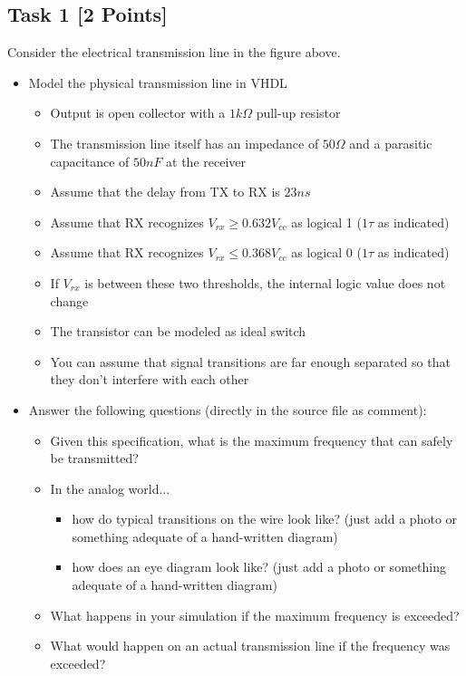 \documentclass[12pt,epsf,makeidx,oneside]{book}
\begin{document}
\subsection{Task 1 [2 Points]}
Consider the electrical transmission line in the figure above.
\begin{itemize}[noitemsep]
  \item Model the physical transmission line in VHDL
  \begin{itemize}[noitemsep]
    \item Output is open collector with a $1k\Omega $ pull-up resistor
    \item The transmission line itself has an impedance of $50\Omega$ and a parasitic capacitance of $50nF$ at the receiver
    \item Assume that the delay from TX to RX is $23ns$
    \item Assume that RX recognizes $V_{rx}\ge0.632V_{cc}$ as logical 1 ($1\tau$ as indicated)
    \item Assume that RX recognizes $V_{rx}\le0.368V_{cc}$ as logical 0 ($1\tau$ as indicated)
    \item If $V_{rx}$ is between these two thresholds, the internal logic value does not change
    \item The transistor can be modeled as ideal switch
    \item You can assume that signal transitions are far enough separated so that they don't interfere with each other
  \end{itemize}
  \item Answer the following questions (directly in the source file as comment):
  \begin{itemize}[noitemsep]
    \item Given this specification, what is the maximum frequency that can safely be transmitted?
    \item In the analog world... 
    \begin{itemize}[noitemsep]
      \item how do typical transitions on the wire look like? (just add a photo or something adequate of a hand-written diagram)
      \item how does an eye diagram look like? (just add a photo or something adequate of a hand-written diagram)
    \end{itemize}
    \item What happens in your simulation if the maximum frequency is exceeded?
    \item What would happen on an actual transmission line if the frequency was exceeded?
  \end{itemize}
\end{itemize}
\end{document}
